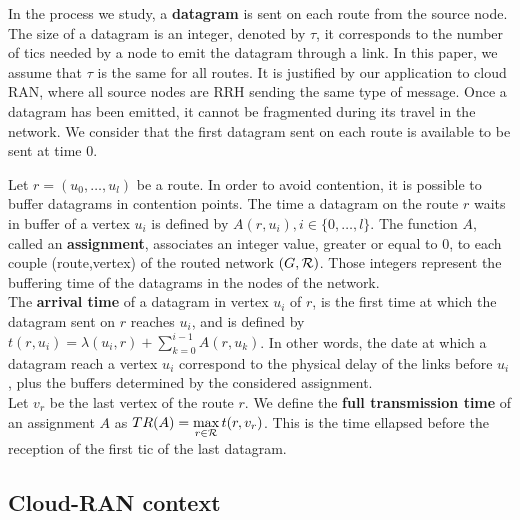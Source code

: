 \documentclass[english]{article}
\begin{document}
        In the process we study, a {\bf datagram} is sent on each route from the source node. The size of a datagram is an integer, denoted by $\tau$, it corresponds to the number of tics needed by a node to emit the datagram through a link.  In this paper, we assume that $\tau$ is the same for all routes. It is justified by our application to cloud RAN, where all source nodes are RRH sending the same type of message. Once a datagram has been emitted, it cannot be fragmented during its travel in the network. We consider that the first datagram sent on each route is available to be sent at time $0$.

          Let $r=(u_0,\dots,u_l)$ be a route. In order to avoid contention, it is possible to buffer datagrams in contention points. The time a datagram on the route $r$ waits in buffer of a vertex $u_i$ is defined by $A(r,u_i), i \in \{0,\ldots,l\}$.
          The function $A$, called an \textbf{assignment}, associates an integer value, greater or equal to $0$, to each couple (route,vertex) of the routed network $(G,{\cal R})$. Those integers represent the buffering time of the datagrams in the nodes of the network. \\
       

 The \textbf{arrival time} of a datagram in vertex $u_i$ of $r$, is the first time at which the datagram sent on $r$ reaches $u_i$, and is defined by $t(r,u_i) = \lambda(u_i,r) + \sum_{k=0}^{i-1} A(r,u_k) $. In other words, the date at which a datagram reach a vertex $u_i$ correspond to the physical delay of the links before $u_i$, plus the buffers determined by the considered assignment.\\
 
  Let $v_r$ be the last vertex of the route $r$. We define the \textbf{full transmission time} of an assignment $A$ as $TR(A) = \displaystyle \max\limits_{r \in {\cal R}} t(r,v_r) $. This is the time ellapsed before the reception of the first tic of the last datagram. 
         
  \subsection{Cloud-RAN context}
     
\end{document}
